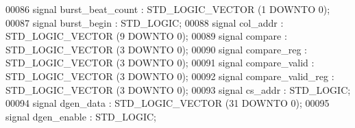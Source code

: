 \begin{DoxyCode}
00086                 \textcolor{keywordflow}{signal} \textcolor{vhdlchar}{burst_beat_count} \textcolor{vhdlchar}{:}  \textcolor{comment}{STD\_LOGIC\_VECTOR} \textcolor{vhdlchar}{(}\textcolor{vhdllogic}{}\textcolor{vhdllogic}{1} \textcolor{keywordflow}{DOWNTO} \textcolor{vhdllogic}{}\textcolor{vhdllogic}{0}\textcolor{vhdlchar}{)};
00087                 \textcolor{keywordflow}{signal} \textcolor{vhdlchar}{burst_begin} \textcolor{vhdlchar}{:}  \textcolor{comment}{STD\_LOGIC};
00088                 \textcolor{keywordflow}{signal} \textcolor{vhdlchar}{col_addr} \textcolor{vhdlchar}{:}  \textcolor{comment}{STD\_LOGIC\_VECTOR} \textcolor{vhdlchar}{(}\textcolor{vhdllogic}{}\textcolor{vhdllogic}{9} \textcolor{keywordflow}{DOWNTO} \textcolor{vhdllogic}{}\textcolor{vhdllogic}{0}\textcolor{vhdlchar}{)};
00089                 \textcolor{keywordflow}{signal} \textcolor{vhdlchar}{compare} \textcolor{vhdlchar}{:}  \textcolor{comment}{STD\_LOGIC\_VECTOR} \textcolor{vhdlchar}{(}\textcolor{vhdllogic}{}\textcolor{vhdllogic}{3} \textcolor{keywordflow}{DOWNTO} \textcolor{vhdllogic}{}\textcolor{vhdllogic}{0}\textcolor{vhdlchar}{)};
00090                 \textcolor{keywordflow}{signal} \textcolor{vhdlchar}{compare_reg} \textcolor{vhdlchar}{:}  \textcolor{comment}{STD\_LOGIC\_VECTOR} \textcolor{vhdlchar}{(}\textcolor{vhdllogic}{}\textcolor{vhdllogic}{3} \textcolor{keywordflow}{DOWNTO} \textcolor{vhdllogic}{}\textcolor{vhdllogic}{0}\textcolor{vhdlchar}{)};
00091                 \textcolor{keywordflow}{signal} \textcolor{vhdlchar}{compare_valid} \textcolor{vhdlchar}{:}  \textcolor{comment}{STD\_LOGIC\_VECTOR} \textcolor{vhdlchar}{(}\textcolor{vhdllogic}{}\textcolor{vhdllogic}{3} \textcolor{keywordflow}{DOWNTO} \textcolor{vhdllogic}{}\textcolor{vhdllogic}{0}\textcolor{vhdlchar}{)};
00092                 \textcolor{keywordflow}{signal} \textcolor{vhdlchar}{compare_valid_reg} \textcolor{vhdlchar}{:}  \textcolor{comment}{STD\_LOGIC\_VECTOR} \textcolor{vhdlchar}{(}\textcolor{vhdllogic}{}\textcolor{vhdllogic}{3} \textcolor{keywordflow}{DOWNTO} \textcolor{vhdllogic}{}\textcolor{vhdllogic}{0}\textcolor{vhdlchar}{)};
00093                 \textcolor{keywordflow}{signal} \textcolor{vhdlchar}{cs_addr} \textcolor{vhdlchar}{:}  \textcolor{comment}{STD\_LOGIC};
00094                 \textcolor{keywordflow}{signal} \textcolor{vhdlchar}{dgen_data} \textcolor{vhdlchar}{:}  \textcolor{comment}{STD\_LOGIC\_VECTOR} \textcolor{vhdlchar}{(}\textcolor{vhdllogic}{}\textcolor{vhdllogic}{31} \textcolor{keywordflow}{DOWNTO} \textcolor{vhdllogic}{}\textcolor{vhdllogic}{0}\textcolor{vhdlchar}{)};
00095                 \textcolor{keywordflow}{signal} \textcolor{vhdlchar}{dgen_enable} \textcolor{vhdlchar}{:}  \textcolor{comment}{STD\_LOGIC};

\end{DoxyCode}

